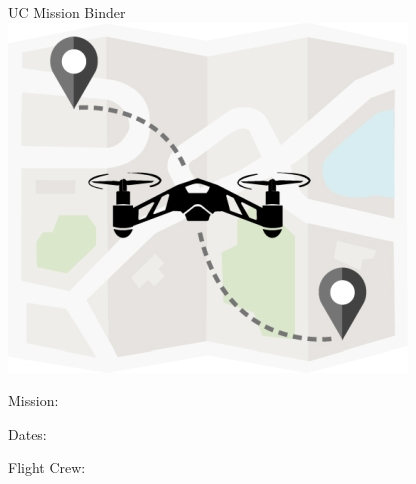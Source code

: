 \thispagestyle{empty}
\begin{center}
\vspace*{9em}
{\Huge UC Mission Binder}\\
\vspace*{9em}
\includegraphics{cover.jpg}\\
\vspace*{9em}
{\huge 

Mission: \hrulefill

Dates: \hrulefill

Flight Crew: \hrulefill

}
\vspace*{9em}
\end{center}

\let\maketitle\oldmaketitle